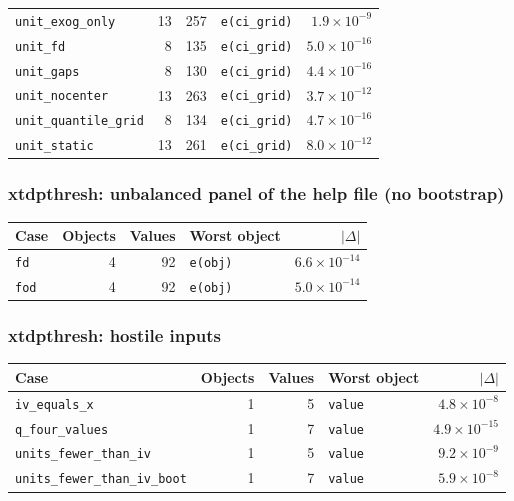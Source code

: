 \documentclass[
  10.5pt,
  a4paper,
]{article}
\begin{document}
\begin{longtable}{@{}p{3.6cm}rrp{4.9cm}r@{}}
\texttt{unit\_\allowbreak{}exog\_\allowbreak{}only} & 13 & 257 & \texttt{e(ci\_\allowbreak{}grid)} & $1.9\times10^{-9}$ \\
\texttt{unit\_\allowbreak{}fd} & 8 & 135 & \texttt{e(ci\_\allowbreak{}grid)} & $5.0\times10^{-16}$ \\
\texttt{unit\_\allowbreak{}gaps} & 8 & 130 & \texttt{e(ci\_\allowbreak{}grid)} & $4.4\times10^{-16}$ \\
\texttt{unit\_\allowbreak{}nocenter} & 13 & 263 & \texttt{e(ci\_\allowbreak{}grid)} & $3.7\times10^{-12}$ \\
\texttt{unit\_\allowbreak{}quantile\_\allowbreak{}grid} & 8 & 134 & \texttt{e(ci\_\allowbreak{}grid)} & $4.7\times10^{-16}$ \\
\texttt{unit\_\allowbreak{}static} & 13 & 261 & \texttt{e(ci\_\allowbreak{}grid)} & $8.0\times10^{-12}$ \\
\bottomrule
\end{longtable}

\subsubsection*{xtdpthresh: unbalanced panel of the help file (no bootstrap)}

\begin{longtable}{@{}p{3.6cm}rrp{4.9cm}r@{}}
\toprule
Case & Objects & Values & Worst object & $|\Delta|$ \\
\midrule
\endhead
\texttt{fd} & 4 & 92 & \texttt{e(obj)} & $6.6\times10^{-14}$ \\
\texttt{fod} & 4 & 92 & \texttt{e(obj)} & $5.0\times10^{-14}$ \\
\bottomrule
\end{longtable}

\subsubsection*{xtdpthresh: hostile inputs}

\begin{longtable}{@{}p{3.6cm}rrp{4.9cm}r@{}}
\toprule
Case & Objects & Values & Worst object & $|\Delta|$ \\
\midrule
\endhead
\texttt{iv\_\allowbreak{}equals\_\allowbreak{}x} & 1 & 5 & \texttt{value} & $4.8\times10^{-8}$ \\
\texttt{q\_\allowbreak{}four\_\allowbreak{}values} & 1 & 7 & \texttt{value} & $4.9\times10^{-15}$ \\
\texttt{units\_\allowbreak{}fewer\_\allowbreak{}than\_\allowbreak{}iv} & 1 & 5 & \texttt{value} & $9.2\times10^{-9}$ \\
\texttt{units\_\allowbreak{}fewer\_\allowbreak{}than\_\allowbreak{}iv\_\allowbreak{}boot} & 1 & 7 & \texttt{value} & $5.9\times10^{-8}$ \\
\bottomrule
\end{longtable}
\end{document}
